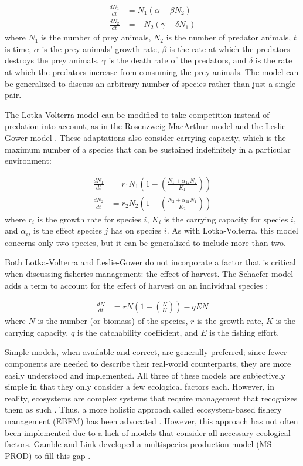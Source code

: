 \begin{align}
   \frac{d N_1}{dt} &=   N_1 \left(\alpha - \beta  N_2\right) 
\\ \frac{d N_2}{dt} &= - N_2 \left(\gamma - \delta N_1\right)
\end{align}
where $N_1$ is the number of prey animals, $N_2$ is the number of predator animals, $t$ is time, $\alpha$ is the prey animals' growth rate, $\beta$ is the rate at which the predators destroys the prey animals, $\gamma$ is the death rate of the predators, and $\delta$ is the rate at which the predators increase from consuming the prey animals.  The model can be generalized to discuss an arbitrary number of species rather than just a single pair.

The Lotka-Volterra model can be modified to take competition instead of predation into account, as in the Rosenzweig-MacArthur model \cite{rosenzweig1963} and the Leslie-Gower model \cite{leslie1960}.  These adaptations also consider carrying capacity, which is the maximum number of a species that can be sustained indefinitely in a particular environment:

\begin{align}
   \frac{d N_1}{dt} &= r_1 N_1 \left(1 - \left(\frac{N_1 + \alpha_{12} N_2}{K_1}\right)\right)
\\ \frac{d N_2}{dt} &= r_2 N_2 \left(1 - \left(\frac{N_2 + \alpha_{21} N_1}{K_2}\right)\right)
\end{align}
where $r_i$ is the growth rate for species $i$, $K_i$ is the carrying capacity for species $i$, and $\alpha_{ij}$ is the effect species $j$ has on species $i$.  As with Lotka-Volterra, this model concerns only two species, but it can be generalized to include more than two.

Both Lotka-Volterra and Leslie-Gower do not incorporate a factor that is critical when discussing fisheries management: the effect of harvest.  The Schaefer model adds a term to account for the effect of harvest on an individual species \cite{schaefer1957}:

\begin{align}
   \frac{d N}{dt} &= r N \left(1 - \left(\frac{N}{K}\right)\right) - q E N
\end{align}
where $N$ is the number (or biomass) of the species, $r$ is the growth rate, $K$ is the carrying capacity, $q$ is the catchability coefficient, and $E$ is the fishing effort.

Simple models, when available and correct, are generally preferred; since fewer components are needed to describe their real-world counterparts, they are more easily understood and implemented.  All three of these models are subjectively simple in that they only consider a few ecological factors each. However, in reality, ecosystems are complex systems that require management that recognizes them as such \cite{christensen1996}.  Thus, a more holistic approach called ecosystem-based fishery management (EBFM) has been advocated \cite{united1999}.  However, this approach has not often been implemented due to a lack of models that consider all necessary ecological factors.  Gamble and Link developed a multispecies production model (MS-PROD) to fill this gap \citeyearpar{gamble2009}.

